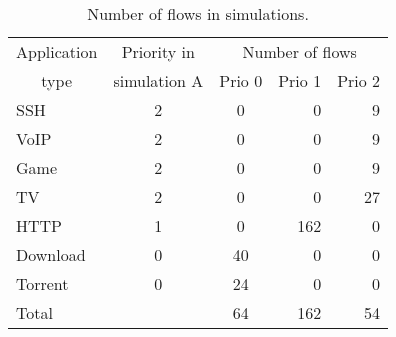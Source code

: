 \begin{table}
	\caption{Number of flows in simulations.}
	\label{tab:flows_count}
	\centering
	
	\begin{tabular}{@{}l|ccrr@{}}
		\toprule
		\multicolumn{1}{c|}{Application} & Priority in  & \multicolumn{3}{c}{Number of flows} \\
		\multicolumn{1}{c|}{type}        & simulation A & Prio 0 & Prio 1 & Prio 2            \\ \midrule
		SSH                              &      2       &      0 &      0 & 9                 \\
		VoIP                             &      2       &      0 &      0 & 9                 \\
		Game                             &      2       &      0 &      0 & 9                 \\
		TV                               &      2       &      0 &      0 & 27                \\
		HTTP                             &      1       &      0 &    162 & 0                 \\
		Download                         &      0       &     40 &      0 & 0                 \\
		Torrent                          &      0       &     24 &      0 & 0                 \\ \midrule
		Total                            &              &     64 &    162 & 54                \\ \bottomrule
	\end{tabular}
\end{table}